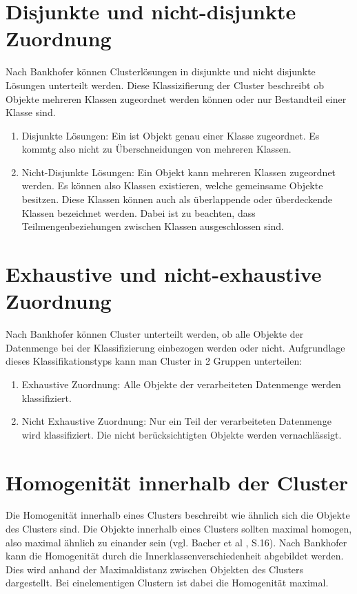\section{Disjunkte und nicht-disjunkte Zuordnung}
Nach Bankhofer \cite{Bankhofer.2008} können Clusterlösungen in disjunkte und nicht disjunkte Lösungen unterteilt werden. Diese Klassizifierung der Cluster beschreibt ob Objekte mehreren Klassen zugeordnet werden können oder nur Bestandteil einer Klasse sind.
\begin{enumerate}
    \item Disjunkte Lösungen: Ein ist Objekt genau einer Klasse zugeordnet. Es kommtg also nicht zu Überschneidungen von mehreren Klassen.
    \item Nicht-Disjunkte Lösungen: Ein Objekt kann mehreren Klassen zugeordnet werden. Es können also Klassen existieren, welche gemeinsame Objekte besitzen. Diese Klassen können auch als überlappende oder überdeckende Klassen bezeichnet werden. Dabei ist zu beachten, dass Teilmengenbeziehungen zwischen Klassen ausgeschlossen sind.
\end{enumerate}

\section{Exhaustive und nicht-exhaustive Zuordnung}
Nach Bankhofer \cite{Bankhofer.2008} können Cluster unterteilt werden, ob alle Objekte der Datenmenge bei der Klassifizierung einbezogen werden oder nicht. Aufgrundlage dieses Klassifikationstyps kann man Cluster in 2 Gruppen unterteilen:
\begin{enumerate}
    \item Exhaustive Zuordnung: Alle Objekte der verarbeiteten Datenmenge werden klassifiziert.
    \item Nicht Exhaustive Zuordnung: Nur ein Teil der verarbeiteten Datenmenge wird klassifiziert. Die nicht berücksichtigten Objekte werden vernachlässigt.
\end{enumerate}

\section{Homogenität innerhalb der Cluster}
Die Homogenität innerhalb eines Clusters beschreibt wie ähnlich sich die Objekte des Clusters sind. Die Objekte innerhalb eines Clusters sollten maximal homogen, also maximal ähnlich zu einander sein (vgl. Bacher et al \cite{Bacher.2010}, S.16).
Nach Bankhofer \cite{Bankhofer.2008} kann die Homogenität durch die Innerklassenverschiedenheit abgebildet werden. Dies wird anhand der Maximaldistanz zwischen Objekten des Clusters dargestellt. Bei einelementigen Clustern ist dabei die Homogenität maximal.

